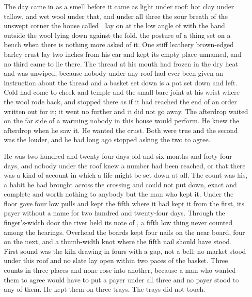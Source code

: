 
The day came in as a smell before it came as light under  roof: hot clay under tallow, and wet wool under that, and under all three the sour  breath of the unswept corner the house called .  lay on  at the low angle of  with the hand outside the wool lying down against the fold, the posture of a thing set on a bench when there is nothing more asked of it. One stiff leathery brown-edged barley crust lay two inches from his ear and kept its empty place unnamed, and no third came to lie there. The thread at his mouth had frozen in the dry heat and was unwiped, because nobody under any roof had ever been given an instruction about the thread and a basket set down is a pot set down and left. Cold had come to cheek and temple and the small bare joint at his wrist where the wool rode back, and stopped there as if it had reached the end of an order written out for it; it went no further and it did not go away. The afterdrop waited on the far side of a warming nobody in this house would perform. He knew the afterdrop when he saw it. He wanted the crust. Both were true and the second was the louder, and he had long ago stopped asking the two to agree.

He was two hundred and twenty-four days old and six months and forty-four days, and nobody under the roof knew a number had been reached, or that there was a kind of account in which a life might be set down at all. The count was his, a habit he had brought across the crossing and could not put down, exact and complete and worth nothing to anybody but the man who kept it. Under the floor  gave four low pulls and kept the fifth where it had kept it from the first, its payer without a name for two hundred and twenty-four days. Through the finger's-width door the river held its note of , a fifth low thing never counted among the hearings. Overhead the boards kept four nails on the near board, four on the next, and a thumb-width knot where the fifth nail should have stood. First sound was the kiln drawing in fours with a gap, not a bell; no market stood under this roof and no slate lay open within two paces of the basket. Three counts in three places and none rose into another, because a man who wanted them to agree would have to put a payer under all three and no payer stood to any of them. He kept them on three trays. The trays did not touch.

